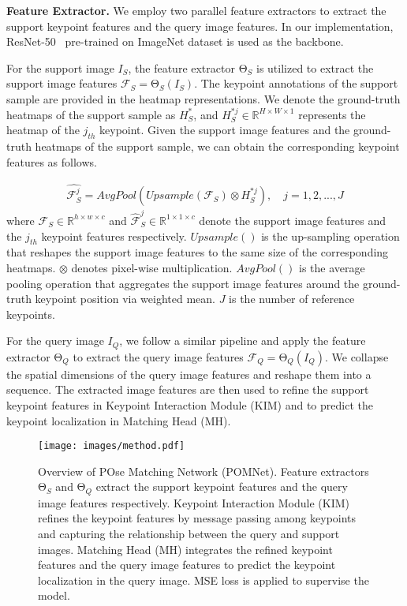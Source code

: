 \documentclass[runningheads]{llncs}
\begin{document}
\textbf{Feature Extractor.}
We employ two parallel feature extractors to extract the support keypoint features and the query image features. In our implementation, ResNet-50~\cite{he2016deep} pre-trained on ImageNet dataset is used as the backbone.

For the support image $I_S$, the feature extractor $\mathrm{\Theta}_{S}$ is utilized to extract the support image features $\mathcal{F}_{S} = \mathrm{\Theta}_{S}(I_S).$ The keypoint annotations of the support sample are provided in the heatmap representations. We denote the ground-truth heatmaps of the support sample as ${H}_{S}^{*}$, and ${H}_{S}^{*j} \in \mathbb{R}^{H \times W \times 1}$ represents the heatmap of the $j_{th}$ keypoint. Given the support image features and the ground-truth heatmaps of the support sample, we can obtain the corresponding keypoint features as follows.

\begin{equation}
\begin{aligned}
    \hat{\mathcal{F}_{S}^{j}} = AvgPool(Upsample(\mathcal{F}_{S}) \otimes {H}_{S}^{*j}), \quad j=1, 2, ..., J
\end{aligned}
\label{eq:F_S}
\end{equation}
where ${\mathcal{F}_{S}} \in \mathbb{R}^{h \times w \times c}$ and $\hat{\mathcal{F}}_{S}^{j} \in \mathbb{R}^{1 \times 1 \times c}$ denote the support image features and the $j_{th}$ keypoint features respectively. $Upsample()$ is the up-sampling operation that reshapes the support image features to the same size of the corresponding heatmaps. $\otimes$ denotes pixel-wise multiplication. $AvgPool()$ is the average pooling operation that aggregates the support image features around the ground-truth keypoint position via weighted mean. $J$ is the number of reference keypoints.

For the query image $I_Q$, we follow a similar pipeline and apply the feature extractor $\mathrm{\Theta}_{Q}$ to extract the query image features $\mathcal{F}_{Q} = \mathrm{\Theta}_{Q}(I_Q)$. We collapse the spatial dimensions of the query image features and reshape them into a sequence. The extracted image features are then used to refine the support keypoint features in Keypoint Interaction Module (KIM) and to predict the keypoint localization in Matching Head (MH).

\begin{figure}[t]
	\centering
	\texttt{[image: images/method.pdf]}
	\caption{Overview of POse Matching Network (POMNet). Feature extractors $\mathrm{\Theta}_{S}$ and $\mathrm{\Theta}_{Q}$ extract the support keypoint features and the query image features respectively. Keypoint Interaction Module (KIM) refines the keypoint features by message passing among keypoints and capturing the relationship between the query and support images.
	Matching Head (MH) integrates the refined keypoint features and the query image features to predict the keypoint localization in the query image. MSE loss is applied to supervise the model.}
	\label{fig:transformer}
\end{figure}
\end{document}
